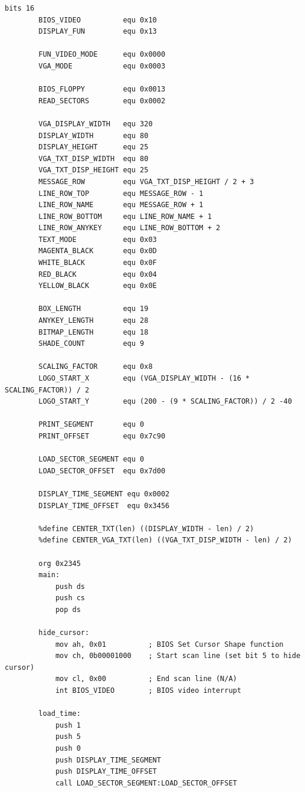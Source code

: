 \documentclass{article}
\begin{document}
    \begin{lstlisting}[caption={loaderV05.asm listing}, captionpos=t]
        bits 16
        BIOS_VIDEO          equ 0x10
        DISPLAY_FUN         equ 0x13

        FUN_VIDEO_MODE      equ 0x0000
        VGA_MODE            equ 0x0003

        BIOS_FLOPPY         equ 0x0013
        READ_SECTORS        equ 0x0002

        VGA_DISPLAY_WIDTH   equ 320
        DISPLAY_WIDTH       equ 80
        DISPLAY_HEIGHT      equ 25
        VGA_TXT_DISP_WIDTH  equ 80
        VGA_TXT_DISP_HEIGHT equ 25
        MESSAGE_ROW         equ VGA_TXT_DISP_HEIGHT / 2 + 3
        LINE_ROW_TOP        equ MESSAGE_ROW - 1
        LINE_ROW_NAME       equ MESSAGE_ROW + 1
        LINE_ROW_BOTTOM     equ LINE_ROW_NAME + 1
        LINE_ROW_ANYKEY     equ LINE_ROW_BOTTOM + 2
        TEXT_MODE           equ 0x03
        MAGENTA_BLACK       equ 0x0D
        WHITE_BLACK         equ 0x0F
        RED_BLACK           equ 0x04
        YELLOW_BLACK        equ 0x0E

        BOX_LENGTH          equ 19
        ANYKEY_LENGTH       equ 28
        BITMAP_LENGTH       equ 18
        SHADE_COUNT         equ 9

        SCALING_FACTOR      equ 0x8
        LOGO_START_X        equ (VGA_DISPLAY_WIDTH - (16 * SCALING_FACTOR)) / 2
        LOGO_START_Y        equ (200 - (9 * SCALING_FACTOR)) / 2 -40

        PRINT_SEGMENT       equ 0
        PRINT_OFFSET        equ 0x7c90

        LOAD_SECTOR_SEGMENT equ 0
        LOAD_SECTOR_OFFSET  equ 0x7d00

        DISPLAY_TIME_SEGMENT equ 0x0002
        DISPLAY_TIME_OFFSET  equ 0x3456

        %define CENTER_TXT(len) ((DISPLAY_WIDTH - len) / 2)
        %define CENTER_VGA_TXT(len) ((VGA_TXT_DISP_WIDTH - len) / 2)

        org 0x2345
        main:
            push ds
            push cs
            pop ds

        hide_cursor:
            mov ah, 0x01          ; BIOS Set Cursor Shape function
            mov ch, 0b00001000    ; Start scan line (set bit 5 to hide cursor)
            mov cl, 0x00          ; End scan line (N/A)
            int BIOS_VIDEO        ; BIOS video interrupt

        load_time:
            push 1
            push 5
            push 0
            push DISPLAY_TIME_SEGMENT
            push DISPLAY_TIME_OFFSET
            call LOAD_SECTOR_SEGMENT:LOAD_SECTOR_OFFSET


\end{lstlisting}
\end{document}
